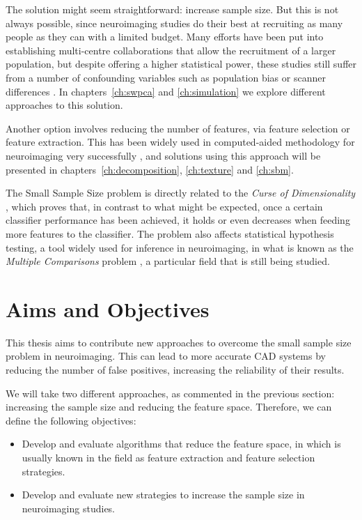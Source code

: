 The solution might seem straightforward: increase sample size. But this is not always possible, since neuroimaging studies do their best at recruiting as many people as they can with a limited budget. Many efforts have been put into establishing multi-centre collaborations that allow the recruitment of a larger population, but despite offering a higher statistical power, these studies still suffer from a number of confounding variables such as population bias or scanner differences \cite{haar2014anatomical}. In chapters~\ref{ch:swpca} and \ref{ch:simulation} we explore different approaches to this solution. 

Another option involves reducing the number of features, via feature selection or feature extraction. This has been widely used in computed-aided methodology for neuroimaging very successfully \cite{DeMartino2007,Xu2009,Gorriz2010,Illan2011,Martinez-Murcia2016}, and solutions using this approach will be presented in chapters~\ref{ch:decomposition}, \ref{ch:texture} and \ref{ch:sbm}. 

The Small Sample Size problem is directly related to the \textit{Curse of Dimensionality} \cite{Krishnaiah1982}, which proves that, in contrast to what might be expected, once a certain classifier performance has been achieved, it holds or even decreases when feeding more features to the classifier. The problem also affects statistical hypothesis testing, a tool widely used for inference in neuroimaging, in what is known as the \textit{Multiple Comparisons} problem \cite{Benjamini2010}, a particular field that is still being studied. 

\section{Aims and Objectives}\label{sec:overview}
This thesis aims to contribute new approaches to overcome the small sample size problem in neuroimaging. This can lead to more accurate \ac{CAD} systems by reducing the number of false positives, increasing the reliability of their results. 

We will take two different approaches, as commented in the previous section: increasing the sample size and reducing the feature space. Therefore, we can define the following objectives: 

\begin{itemize}
	\item Develop and evaluate algorithms that reduce the feature space, in which is usually known in the field as feature extraction and feature selection strategies. 
	\item Develop and evaluate new strategies to increase the sample size in neuroimaging studies. 
\end{itemize}

